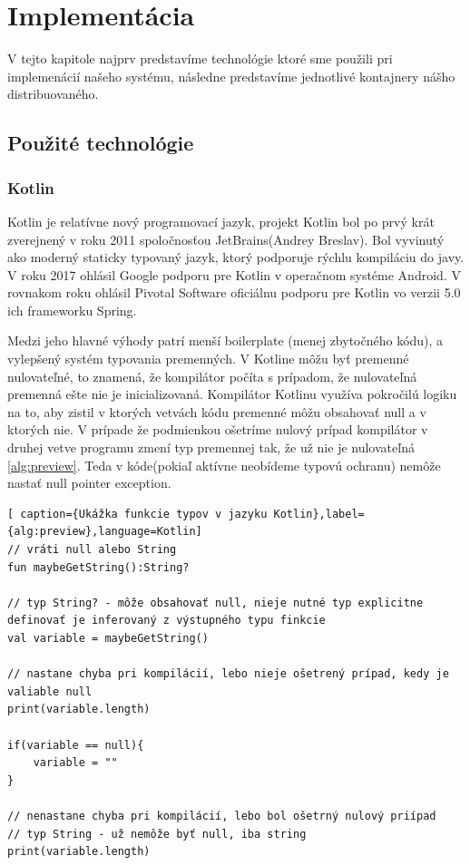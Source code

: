 \section{Implementácia}  
V tejto kapitole najprv predstavíme technológie ktoré sme použili pri implemenácií našeho systému, následne predstavíme jednotlivé kontajnery nášho distribuovaného.


\subsection{Použité technológie} 


\subsubsection{Kotlin}  
Kotlin je relatívne nový programovací jazyk, projekt Kotlin bol po prvý krát zverejnený v roku 2011 spoločnosťou JetBrains(Andrey Breslav). Bol vyvinutý ako moderný staticky typovaný jazyk, ktorý podporuje rýchlu kompiláciu do javy. V roku 2017 ohlásil Google podporu pre Kotlin v operačnom systéme Android. V rovnakom roku ohlásil Pivotal Software oficiálnu podporu pre Kotlin vo verzii 5.0 ich frameworku Spring.

Medzi jeho hlavné výhody patrí menší boilerplate (menej zbytočného kódu), a vylepšený systém typovania premenných. V Kotline  môžu byť premenné nulovateľné, to znamená, že kompilátor počíta s prípadom, že nulovateľná premenná ešte nie je inicializovaná. Kompilátor Kotlinu využíva pokročilú logiku na to, aby zistil v ktorých vetvách kódu premenné môžu obsahovať null a v ktorých nie. V prípade že podmienkou ošetríme nulový prípad kompilátor v druhej vetve programu zmení typ premennej tak, že už nie je nulovateľná \ref{alg:preview}. Teda v kóde(pokiaľ aktívne neobídeme typovú ochranu) nemôže nastať null pointer exception. 


\begin{lstlisting}[ caption={Ukážka funkcie typov v jazyku Kotlin},label={alg:preview},language=Kotlin] 
// vráti null alebo String 
fun maybeGetString():String? 

// typ String? - môže obsahovať null, nieje nutné typ explicitne definovať je inferovaný z výstupného typu finkcie
val variable = maybeGetString() 

// nastane chyba pri kompilácií, lebo nieje ošetrený prípad, kedy je valiable null 
print(variable.length) 

if(variable == null){ 
	variable = "" 
} 

// nenastane chyba pri kompilácií, lebo bol ošetrný nulový priípad
// typ String - už nemôže byť null, iba string
print(variable.length)  
\end{lstlisting} 


